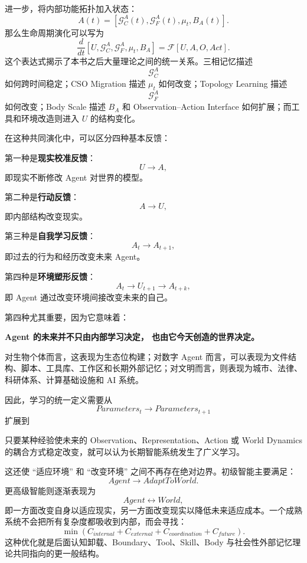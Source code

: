 进一步，将内部功能拓扑加入状态：
\[
A(t)
=
\left[
\mathcal G_C^A(t),
\mathcal G_F^A(t),
\mu_t,
B_A(t)
\right].
\]
那么生命周期演化可以写为
\[
\frac{d}{dt}
\left[
U,
\mathcal G_C^A,
\mathcal G_F^A,
\mu_t,
B_A
\right]
=
\mathcal F
\left[
U,
A,
O,
Act
\right].
\]
这个表达式揭示了本书之后大量理论之间的统一关系。三相记忆描述
\[
\mathcal G_C^A
\]
如何跨时间稳定；CSO Migration 描述 $\mu_t$ 如何改变；Topology Learning 描述
\[
\mathcal G_F^A
\]
如何改变；Body Scale 描述 $B_A$ 和 Observation--Action Interface 如何扩展；而工具和环境改造则进入 $U$ 的结构变化。

在这种共同演化中，可以区分四种基本反馈：

第一种是\textbf{现实校准反馈}：
\[
U
\rightarrow
A,
\]
即现实不断修改 Agent 对世界的模型。

第二种是\textbf{行动反馈}：
\[
A
\rightarrow
U,
\]
即内部结构改变现实。

第三种是\textbf{自我学习反馈}：
\[
A_t
\rightarrow
A_{t+1},
\]
即过去的行为和经历改变未来 Agent。

第四种是\textbf{环境塑形反馈}：
\[
A_t
\rightarrow
U_{t+1}
\rightarrow
A_{t+k},
\]
即 Agent 通过改变环境间接改变未来的自己。

第四种尤其重要，因为它意味着：
\begin{statementbox}
\centering\bfseries
Agent 的未来并不只由内部学习决定，
也由它今天创造的世界决定。
\end{statementbox}
对生物个体而言，这表现为生态位构建；对数字 Agent 而言，可以表现为文件结构、脚本、工具库、工作区和长期外部记忆；对文明而言，则表现为城市、法律、科研体系、计算基础设施和 AI 系统。

因此，学习的统一定义需要从
\[
Parameters_t
\rightarrow
Parameters_{t+1}
\]
扩展到
\begin{statementbox}
\centering
{}
\end{statementbox}
只要某种经验使未来的 Observation、Representation、Action 或 World Dynamics 的耦合方式稳定改变，就可以认为长期智能系统发生了广义学习。

这还使 ``适应环境'' 和 ``改变环境'' 之间不再存在绝对边界。初级智能主要满足：
\[
Agent\rightarrow AdaptToWorld.
\]
更高级智能则逐渐表现为
\[
Agent\leftrightarrow World,
\]
即一方面改变自身以适应现实，另一方面改变现实以降低未来适应成本。一个成熟系统不会把所有复杂度都吸收到内部，而会寻找：
\[
\min
\left(
C_{internal}
+
C_{external}
+
C_{coordination}
+
C_{future}
\right).
\]
这种优化就是后面认知卸载、Boundary、Tool、Skill、Body 与社会性外部记忆理论共同指向的更一般结构。

